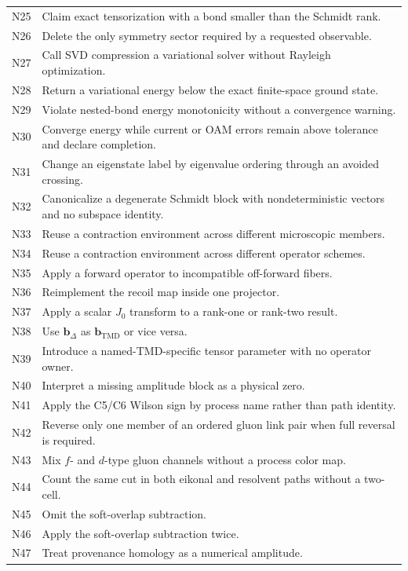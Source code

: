 \documentclass[11pt]{article}
\newcommand{\bD}{\bm{b}_{\Delta}}
\newcommand{\bM}{\bm{b}_{\mathrm{TMD}}}
\begin{document}
\begin{longtable}{L{0.10\textwidth}L{0.82\textwidth}}
N25 & Claim exact tensorization with a bond smaller than the Schmidt rank.\\
N26 & Delete the only symmetry sector required by a requested observable.\\
N27 & Call SVD compression a variational solver without Rayleigh optimization.\\
N28 & Return a variational energy below the exact finite-space ground state.\\
N29 & Violate nested-bond energy monotonicity without a convergence warning.\\
N30 & Converge energy while current or OAM errors remain above tolerance and declare completion.\\
N31 & Change an eigenstate label by eigenvalue ordering through an avoided crossing.\\
N32 & Canonicalize a degenerate Schmidt block with nondeterministic vectors and no subspace identity.\\
N33 & Reuse a contraction environment across different microscopic members.\\
N34 & Reuse a contraction environment across different operator schemes.\\
N35 & Apply a forward operator to incompatible off-forward fibers.\\
N36 & Reimplement the recoil map inside one projector.\\
N37 & Apply a scalar \(J_0\) transform to a rank-one or rank-two result.\\
N38 & Use \(\bD\) as \(\bM\) or vice versa.\\
N39 & Introduce a named-TMD-specific tensor parameter with no operator owner.\\
N40 & Interpret a missing amplitude block as a physical zero.\\
N41 & Apply the C5/C6 Wilson sign by process name rather than path identity.\\
N42 & Reverse only one member of an ordered gluon link pair when full reversal is required.\\
N43 & Mix \(f\)- and \(d\)-type gluon channels without a process color map.\\
N44 & Count the same cut in both eikonal and resolvent paths without a two-cell.\\
N45 & Omit the soft-overlap subtraction.\\
N46 & Apply the soft-overlap subtraction twice.\\
N47 & Treat provenance homology as a numerical amplitude.\\

\end{longtable}
\end{document}
